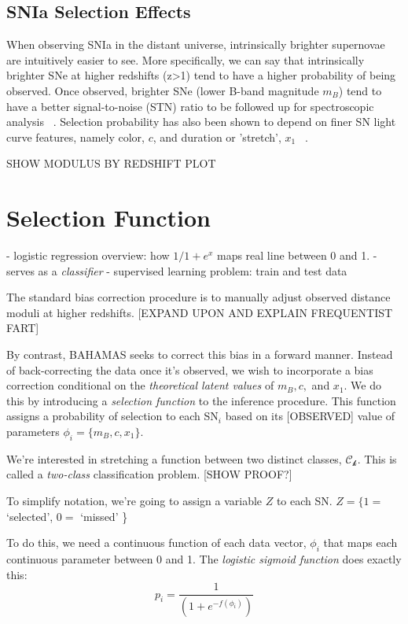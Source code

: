 \documentclass[12pt]{article}
\begin{document}
\subsection{SNIa Selection Effects}
When observing SNIa in the distant universe, intrinsically brighter supernovae are intuitively easier to see. More specifically, we can say that intrinsically brighter SNe at higher redshifts (z>1) tend to have a higher probability of being observed. Once observed, brighter SNe (lower B-band magnitude $m_B$) tend to have a better signal-to-noise (STN) ratio to be followed up for spectroscopic analysis ~\cite{shariff_2017}. Selection probability has also been shown to depend on finer SN light curve features, namely color, $c$, and duration or 'stretch', $x_1$ ~\cite{chotard_etal, guy_etal}. 

SHOW MODULUS BY REDSHIFT PLOT


\section{Selection Function}


- logistic regression overview: how $1/1+e^x$ maps real line between 0 and 1.
- serves as a \textit{classifier}
- supervised learning problem: train and test data


The standard bias correction procedure is to manually adjust observed distance moduli at higher redshifts. [EXPAND UPON AND EXPLAIN FREQUENTIST FART]

By contrast, BAHAMAS seeks to correct this bias in a forward manner. Instead of back-correcting the data once it's observed, we wish to incorporate a bias correction conditional on the \textit{theoretical latent values} of $m_B, c,$ and  $x_1$. We do this by introducing a \textit{selection function} to the inference procedure. This function assigns a probability of selection to each SN$_i$ based on its [OBSERVED] value of parameters $\phi_i = \{m_B, c, x_1\}$.

We're interested in stretching a function between two distinct classes, $\mathscr{C_{k}}$. This is called a \textit{two-class} classification problem. [SHOW PROOF?] ~\cite{bishop_2006}


To simplify notation, we're going to assign a variable $Z$ to each SN. $Z = \{1 =$ `selected',  $0 =$ `missed' \}




To do this, we need a continuous function of each data vector, $\phi_i$ that maps each continuous parameter between 0 and 1. The \textit{logistic sigmoid function} does exactly this: 
\begin{equation}\label{sigmoid}
  p_i = \frac{1}{(1 + e^{-f(\phi_i)})} 
\end{equation}
\end{document}
